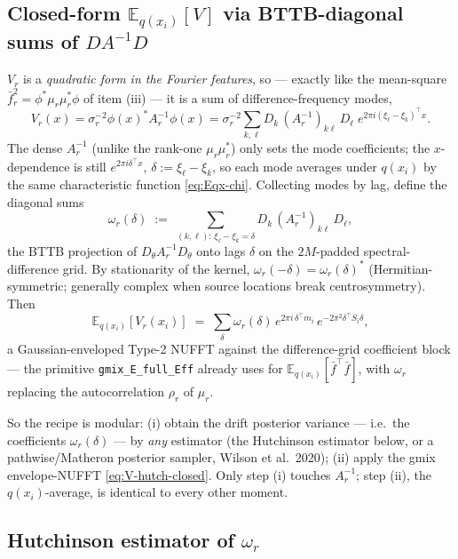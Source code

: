 \documentclass[11pt]{article}
\newcommand{\E}{\mathbb{E}}
\newcommand{\Eqx}{\mathbb{E}_{q(x_i)}}
\newcommand{\code}[1]{\texttt{\small #1}}
\begin{document}
\subsection{Closed-form $\Eqx[V]$ via BTTB-diagonal sums of $D A^{-1} D$}

$V_r$ is a \emph{quadratic form in the Fourier features}, so --- exactly
like the mean-square $\bar f_r^2=\phi^*\mu_r\mu_r^*\phi$ of item (iii) ---
it is a sum of difference-frequency modes,
\begin{equation}
V_r(x)=\sigma_r^{-2}\phi(x)^*A_r^{-1}\phi(x)
=\sigma_r^{-2}\sum_{k,\ell}D_k\,(A_r^{-1})_{k\ell}\,D_\ell\;
 e^{2\pi i(\xi_\ell-\xi_k)^\top x}.
\end{equation}
The dense $A_r^{-1}$ (unlike the rank-one $\mu_r\mu_r^*$) only sets the mode
coefficients; the $x$-dependence is still $e^{2\pi i\delta^\top x}$,
$\delta:=\xi_\ell-\xi_k$, so each mode averages under $q(x_i)$ by the same
characteristic function \eqref{eq:Eqx-chi}. Collecting modes by lag, define
the diagonal sums
\begin{equation}
\omega_r(\delta) \;:=\; \sum_{(k,\ell):\,\xi_\ell - \xi_k = \delta}
   D_k\,(A_r^{-1})_{k\ell}\,D_\ell,
\label{eq:omega-def}
\end{equation}
the BTTB projection of $D_\theta A_r^{-1} D_\theta$ onto lags $\delta$
on the $2M$-padded spectral-difference grid. By stationarity of the
kernel, $\omega_r(-\delta) = \omega_r(\delta)^*$ (Hermitian-symmetric;
generally complex when source locations break centrosymmetry). Then
\begin{equation}
\E_{q(x_i)}[V_r(x_i)]
\;=\; \sum_\delta \omega_r(\delta)\,
       e^{2\pi i\,\delta^\top m_i}\,
       e^{-2\pi^2 \delta^\top S_i \delta},
\label{eq:V-hutch-closed}
\end{equation}
a Gaussian-enveloped Type-2 NUFFT against the difference-grid coefficient
block --- the primitive \code{gmix\_E\_full\_Eff} already uses for
$\Eqx[\bar f^\top\bar f]$, with $\omega_r$ replacing the autocorrelation
$\rho_r$ of $\mu_r$.

So the recipe is modular: (i) obtain the drift posterior variance --- i.e.\
the coefficients $\omega_r(\delta)$ --- by \emph{any} estimator (the
Hutchinson estimator below, or a pathwise/Matheron posterior sampler,
Wilson et al.\ 2020); (ii) apply the gmix envelope-NUFFT
\eqref{eq:V-hutch-closed}. Only step (i) touches $A_r^{-1}$; step (ii),
the $q(x_i)$-average, is identical to every other moment.

\subsection{Hutchinson estimator of $\omega_r$}
\end{document}
